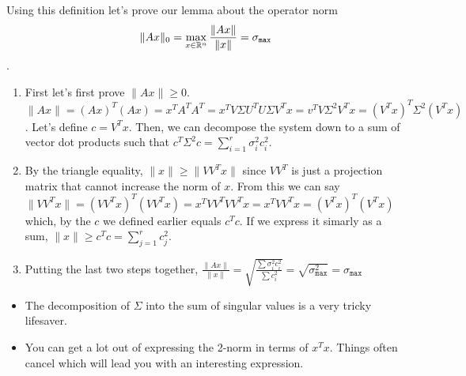 \documentclass[11pt]{article}
\begin{document}
\begin{examplebox}[1.7]\quad
	\noindent Using this definition let's prove our lemma about the operator norm
	$$\|Ax\|_0 = \displaystyle \max_{x \in \mathbb{R}^{n}} \frac{\|Ax\|}{\|x\|} = \sigma_{\texttt{max}}$$. 
	\begin{solution}[1.7]\quad
		\begin{enumerate}
			\item First let's first prove $\|Ax \| \geq 0$. $\|Ax\| = (Ax)^{T}(Ax) = x^{T}A^{T}A^{T} = x^{T}V\Sigma U^{T}U \Sigma V^{T}x = v^{T}V \Sigma^{2}V^{T}x = (V^{T}x)^{T}\Sigma^{2}(V^{T}x)$. Let's define $c = V^{T}x$. Then, we can decompose the system down to a sum of vector dot products such that $c^{T}\Sigma^{2}c = \displaystyle\sum_{i=1}^{r}\sigma_{i}^{2}c_{i}^{2}$.
			\item By the triangle equality, $\|x \| \geq \| V V^{T} x\|$ since $VV^{T}$ is just a projection matrix that cannot increase the norm of $x$. From this we can  say $\|V V^{T}x\| = (VV^{T}x)^{T}(VV^{T}x) = x^{T}VV^{T}VV^{T}x = x^{T}VV^{T}x = (V^{T}x)^{T}(V^{T}x)$ which, by the $c$ we defined earlier equals $c^{T}c$. If we express it simarly as a sum, $\|x \| \geq c^{T}c = \displaystyle\sum_{j=1}^{r}c_{j}^{2}$.
			\item Putting the last two steps together, $\displaystyle \frac{\|Ax\|}{\|x\|} = \sqrt{ \frac{\sum \sigma_{i}^{2}c_{i}^{2}}{\sum c_{i}^{2}} } = \sqrt{\sigma_{\texttt{max}}^{2}} = \sigma_{\texttt{max}}$ 
		\end{enumerate}
	    
	\end{solution}
	\begin{takeaways}[1.7]\quad
		\begin{itemize}
			\item The decomposition of $\Sigma$ into the sum of singular values is a very tricky lifesaver. 
			\item You can get a lot out of expressing the 2-norm in terms of $x^{T}x$. Things often cancel which will lead you with an interesting expression.
		\end{itemize}
	    
	\end{takeaways}
\end{examplebox}
\end{document}
